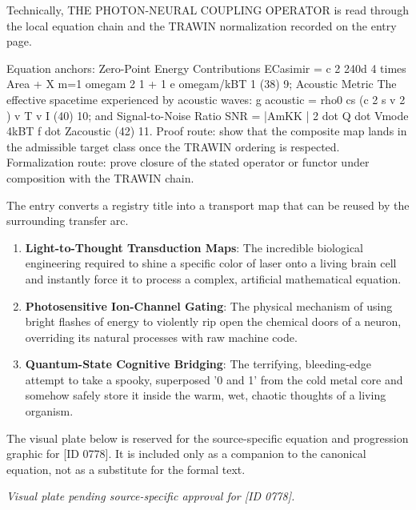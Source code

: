 Technically, THE PHOTON-NEURAL COUPLING OPERATOR is read through the local equation chain and the TRAWIN normalization recorded on the entry page.

Equation anchors: Zero-Point Energy Contributions ECasimir =    c 2 240d 4 times Area + X  m=1  omegam 2 1 + 1 e  omegam/kBT   1 (38) 9; Acoustic Metric The effective spacetime experienced by acoustic waves: g acoustic    = rho0 cs  (c 2 s   v 2 )  v T  v I (40) 10; and Signal-to-Noise Ratio SNR = |AmKK | 2 dot Q dot Vmode   4kBT  f dot Zacoustic (42) 11. Proof route: show that the composite map lands in the admissible target class once the TRAWIN ordering is respected. Formalization route: prove closure of the stated operator or functor under composition with the TRAWIN chain.

The entry converts a registry title into a transport map that can be reused by the surrounding transfer arc.
\endgroup

\begin{enumerate}[leftmargin=1.6em,itemsep=6pt,topsep=4pt]
\item \textbf{Light-to-Thought Transduction Maps}: The incredible biological engineering required to shine a specific color of laser onto a living brain cell and instantly force it to process a complex, artificial mathematical equation.
\item \textbf{Photosensitive Ion-Channel Gating}: The physical mechanism of using bright flashes of energy to violently rip open the chemical doors of a neuron, overriding its natural processes with raw machine code.
\item \textbf{Quantum-State Cognitive Bridging}: The terrifying, bleeding-edge attempt to take a spooky, superposed '0 and 1' from the cold metal core and somehow safely store it inside the warm, wet, chaotic thoughts of a living organism.
\end{enumerate}

\begingroup\footnotesize\sloppy
The visual plate below is reserved for the source-specific equation and progression graphic for [ID 0778]. It is included only as a companion to the canonical equation, not as a substitute for the formal text.
\par\endgroup
\begingroup\footnotesize\itshape
Visual plate pending source-specific approval for [ID 0778].
\par\endgroup

